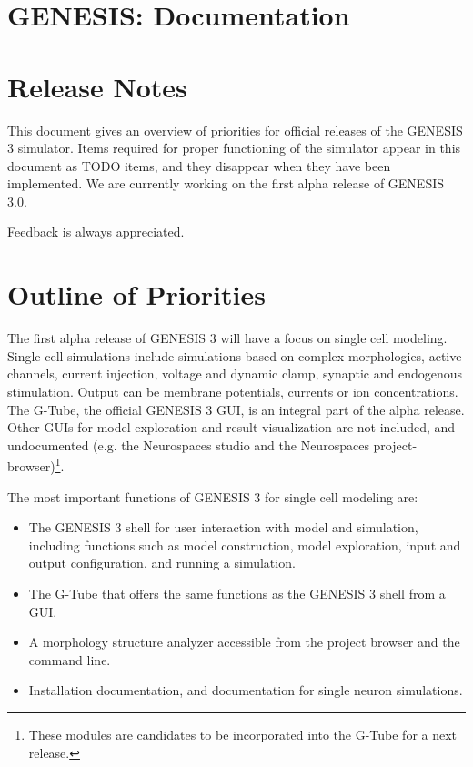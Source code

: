 \documentclass[12pt]{article}
\begin{document}
\section*{GENESIS: Documentation}

\section*{Release Notes}

This document gives an overview of priorities for official releases of
the GENESIS 3 simulator.  Items required for proper functioning of the
simulator appear in this document as TODO items, and they disappear
when they have been implemented.  We are currently working on the
first alpha release of GENESIS 3.0.

Feedback is always appreciated.


\section{Outline of Priorities}

The first alpha release of GENESIS 3 will have a focus on single cell
modeling.  Single cell simulations include simulations based on
complex morphologies, active channels, current injection, voltage and
dynamic clamp, synaptic and endogenous stimulation.  Output can be
membrane potentials, currents or ion concentrations.  The G-Tube, the
official GENESIS 3 GUI, is an integral part of the alpha release.
Other GUIs for model exploration and result visualization are not
included, and undocumented (e.g. the Neurospaces studio and the
Neurospaces project-browser)\footnote{These modules are candidates to
  be incorporated into the G-Tube for a next release.}.

The most important functions of GENESIS 3 for single cell modeling
are:

\begin{itemize}
\item The GENESIS 3 shell for user interaction with model and
  simulation, including functions such as model construction, model
  exploration, input and output configuration, and running a
  simulation.
\item The G-Tube that offers the same functions as the GENESIS 3 shell
  from a GUI.
\item A morphology structure analyzer accessible from the project
  browser and the command line.
\item Installation documentation, and documentation for single neuron
  simulations.
\end{itemize}
\end{document}
